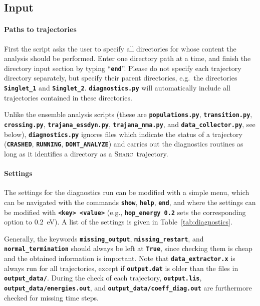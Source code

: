 \documentclass[a4paper,10pt,DIV=15,openany]{scrbook}
\newcommand{\sharc}{\textsc{Sharc}}
\newcommand{\ttt}[1]{\textbf{\texttt{#1}}}
\begin{document}
\subsection{Input}

\paragraph{Paths to trajectories}

First the script asks the user to specify all directories for whose content the analysis should be performed. Enter one directory path at a time, and finish the directory input section by typing ``\ttt{end}''. Please do not specify each trajectory directory separately, but specify their parent directories, e.g.\ the directories \ttt{Singlet\_1} and \ttt{Singlet\_2}. \ttt{diagnostics.py} will automatically include all trajectories contained in these directories.

Unlike the ensemble analysis scripts (these are \ttt{populations.py}, \ttt{transition.py}, \ttt{crossing.py}, \ttt{trajana\_essdyn.py}, \ttt{trajana\_nma.py}, and \ttt{data\_collector.py}, see below), \ttt{diagnostics.py} ignores files which indicate the status of a trajectory (\ttt{CRASHED}, \ttt{RUNNING}, \ttt{DONT\_ANALYZE}) and carries out the diagnostics routines as long as it identifies a directory as a \sharc\ trajectory.

\paragraph{Settings}

The settings for the diagnostics run can be modified with a simple menu, which can be navigated with the commands \ttt{show}, \ttt{help}, \ttt{end}, and where the settings can be modified with \ttt{<key> <value>} (e.g., \ttt{hop\_energy 0.2} sets the corresponding option to 0.2~eV).
A list of the settings is given in Table~\ref{tab:diagnostics}.

Generally, the keywords \ttt{missing\_output}, \ttt{missing\_restart}, and \ttt{normal\_termination} should always be left at \ttt{True}, since checking them is cheap and the obtained information is important.
Note that \ttt{data\_extractor.x} is always run for all trajectories, except if \ttt{output.dat} is older than the files in \ttt{output\_data/}.
During the check of each trajectory, \ttt{output.lis}, \ttt{output\_data/energies.out}, and \ttt{output\_data/coeff\_diag.out} are furthermore checked for missing time steps.
\end{document}
